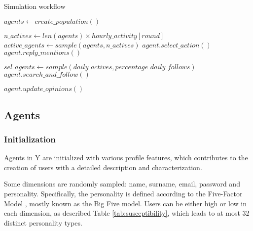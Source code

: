 \begin{algorithm}
\caption{Simulation workflow}
\label{alg:workflow}
\begin{algorithmic}[1]
\STATE $agents \gets create\_population()$

        \STATE $n\_actives \gets len(agents) \times hourly\_activity[round]$
        \STATE $active\_agents \gets sample(agents, n\_actives)$ 
            \STATE $agent.select\_action()$
            \STATE $agent.reply\_mentions()$
        \ENDFOR
    \ENDFOR

    \STATE $sel\_agents \gets sample(daily\_actives, percentage\_daily\_follows)$
        \STATE $agent.search\_and\_follow()$
    \ENDFOR

        \STATE $agent.update\_opinions()$
    \ENDFOR

\ENDFOR
\end{algorithmic}
\end{algorithm}



\subsection{Agents}

\subsubsection{Initialization}
Agents in Y are initialized with various profile features, which contributes to the creation of users with a detailed description and characterization.

Some dimensions are randomly sampled: name, surname, email, password and personality.
Specifically, the personality is defined according to the Five-Factor Model \cite{barrick1991bigfive, McCrae1992}, mostly known as the Big Five model. 
Users can be either high or low in each dimension, as described Table \ref{tab:susceptibility}, which leads to at most 32 distinct personality types.

